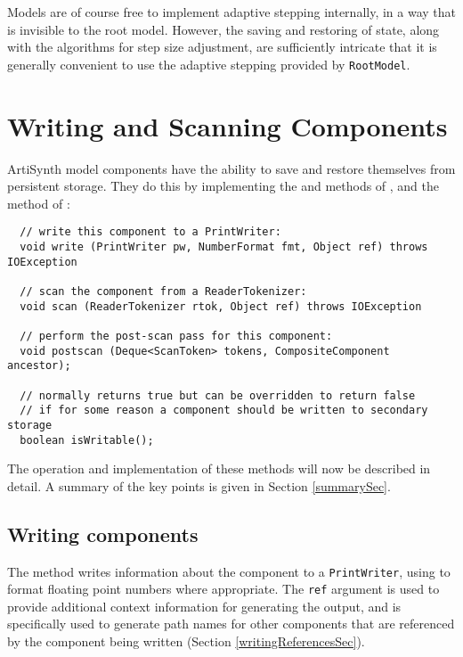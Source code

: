 \documentclass{article}
\begin{document}
\begin{sideblock}
Models are of course free to implement adaptive stepping internally, in a
way that is invisible to the root model. However, the saving and
restoring of state, along with the algorithms for step size
adjustment, are sufficiently intricate that it is generally
convenient to use the adaptive stepping provided by {\tt RootModel}.
\end{sideblock}

\section{Writing and Scanning Components}
\label{writingAndScanningSec}

\setjavabase{}

ArtiSynth model components have the ability to save and restore
themselves from persistent storage. They do this by implementing the
 and 
 methods of
, and the 
method of :

\begin{lstlisting}
  // write this component to a PrintWriter:
  void write (PrintWriter pw, NumberFormat fmt, Object ref) throws IOException

  // scan the component from a ReaderTokenizer:
  void scan (ReaderTokenizer rtok, Object ref) throws IOException

  // perform the post-scan pass for this component:
  void postscan (Deque<ScanToken> tokens, CompositeComponent ancestor);

  // normally returns true but can be overridden to return false 
  // if for some reason a component should be written to secondary storage
  boolean isWritable();
\end{lstlisting}

The operation and implementation of these methods will now be
described in detail. A summary of the key points is given in Section
\ref{summarySec}.

\subsection{Writing components}

The  method writes
information about the component to a {\tt PrintWriter}, using
 to format floating point
numbers where appropriate. The {\tt ref} argument is used to provide
additional context information for generating the output, and is
specifically used to generate path names for other components
that are referenced by the component being written
(Section \ref{writingReferencesSec}).
\end{document}
